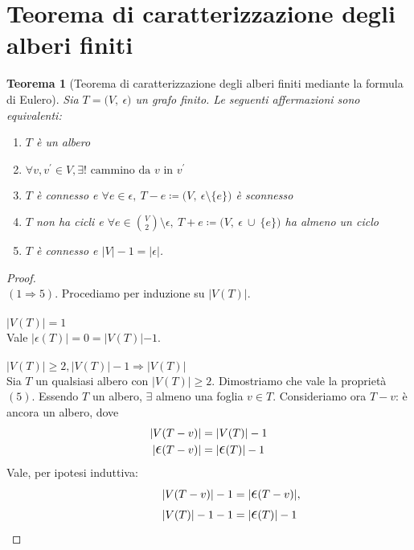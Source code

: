 \documentclass[12pt,twoscolu]{article}
\newcommand{\implica}{\Longrightarrow}
\newcommand{\pr}{\prime}
\renewcommand\qedsymbol{$\blacksquare$}
\newcommand{\Eps}{${\Large$\epsilon$}$}
\newcommand{\grafo}{(V, \: \Eps)}
\newcommand{\baseinduzalbero}[1]{\\\\{\boldmath$ |V(T)| = #1$}}
\newcommand{\induzalbero}[1]{\\\\{\boldmath$|V(T)| \ge #1, |V(T)| -1 \implica |V(T)|$}}
\newtheorem{theorem}{Teorema}
\begin{document}
\section{Teorema di caratterizzazione degli alberi finiti}
\begin{theorem}[Teorema di caratterizzazione degli alberi finiti mediante la formula di Eulero]
Sia $T = \grafo$ un grafo finito. Le seguenti affermazioni sono equivalenti:
\begin{enumerate}
\item $T$ è un albero
\item $\forall v, v^{\pr} \in V, \exists! \text{ cammino da } v \text{ in } v^{\pr}$
\item $T$ è connesso e $\forall e \in \Eps,\ T-e \coloneqq (V,\ \Eps \setminus \{e\})$ è sconnesso
\item $T$ non ha cicli e $\forall e \in \binom{V}{2} \setminus \Eps, \ T + e \coloneqq (V, \ \Eps \ \cup \ \{e\})$ ha almeno un ciclo
\item $T$ è connesso e $|V| - 1 = |\Eps|$.
\end{enumerate}
\end{theorem}

\renewcommand\qedsymbol{$\square$}
\begin{proof}\ \\
$(1 \implica 5).$ Procediamo per induzione su $|V(T)|$.
\baseinduzalbero{1}
\\Vale $|\Eps(T)| = 0 = |V(T)| - 1$.
\induzalbero{2}\nopagebreak
\\Sia $T$ un qualsiasi albero con $|V(T)| \ge 2$. Dimostriamo che vale la proprietà $(5)$. Essendo $T$ un albero, $\exists$ almeno una foglia $v \in T$. Consideriamo ora $T - v$: è ancora un albero, dove
\begin{align*}
|V(T-v)| &= |V(T)| - 1 \\
| \mathlarger{\mathlarger{\epsilon}} (T-v) | &= |\mathlarger{\mathlarger{\epsilon}} (T) | -1 
\end{align*}
Vale, per ipotesi induttiva:
\begin{align*}
|V(T-v) | -1 &= |\mathlarger{\mathlarger{\epsilon}}(T-v)|,
\\ \qquad\qquad |V(T)| -1 -1 &= |\mathlarger{\mathlarger{\epsilon}}(T) | -1
\end{align*}
\end{proof}
\end{document}
